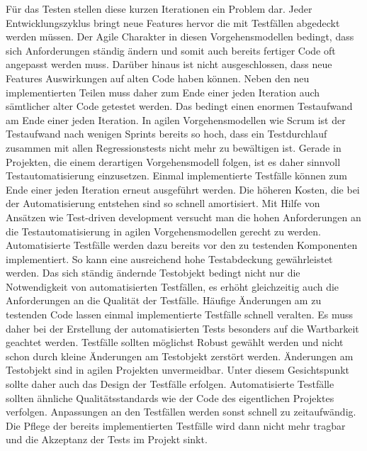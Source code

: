 Für das Testen stellen diese kurzen Iterationen ein Problem dar.
Jeder Entwicklungszyklus bringt neue Features hervor die mit Testfällen abgedeckt werden müssen. Der Agile Charakter in diesen Vorgehensmodellen bedingt, dass sich Anforderungen ständig ändern und somit auch bereits fertiger Code oft angepasst werden muss. Darüber hinaus ist nicht ausgeschlossen, dass neue Features Auswirkungen auf alten Code haben können. Neben den neu implementierten Teilen muss daher zum Ende einer jeden Iteration auch sämtlicher alter Code getestet werden.
Das bedingt einen enormen Testaufwand am Ende einer jeden Iteration. 
In agilen Vorgehensmodellen wie Scrum ist der Testaufwand nach wenigen Sprints bereits so hoch, dass ein Testdurchlauf zusammen mit allen Regressionstests nicht mehr zu bewältigen ist.
Gerade in Projekten, die einem derartigen Vorgehensmodell folgen, ist es daher sinnvoll Testautomatisierung einzusetzen. Einmal implementierte Testfälle können zum Ende einer jeden Iteration erneut ausgeführt werden. Die höheren Kosten, die bei der Automatisierung entstehen sind so schnell amortisiert.
Mit Hilfe von Ansätzen wie Test-driven development versucht man die hohen Anforderungen an die Testautomatisierung in agilen Vorgehensmodellen gerecht zu werden. Automatisierte Testfälle werden dazu bereits vor den zu testenden Komponenten implementiert. So kann eine ausreichend hohe Testabdeckung gewährleistet werden.
Das sich ständig ändernde Testobjekt bedingt nicht nur die Notwendigkeit von automatisierten Testfällen, es erhöht gleichzeitig auch die Anforderungen an die Qualität der Testfälle. Häufige Änderungen am zu testenden Code lassen einmal implementierte Testfälle schnell veralten. Es muss daher bei der Erstellung der automatisierten Tests besonders auf die Wartbarkeit geachtet werden. Testfälle sollten möglichst Robust gewählt werden und nicht schon durch kleine Änderungen am Testobjekt zerstört werden. Änderungen am Testobjekt sind in agilen Projekten unvermeidbar. Unter diesem Gesichtspunkt sollte daher auch das Design der Testfälle erfolgen. Automatisierte Testfälle sollten ähnliche Qualitätsstandards wie der Code des eigentlichen Projektes verfolgen. Anpassungen an den Testfällen werden sonst schnell zu zeitaufwändig. Die Pflege der bereits implementierten Testfälle wird dann nicht mehr tragbar und die Akzeptanz der Tests im Projekt sinkt.
